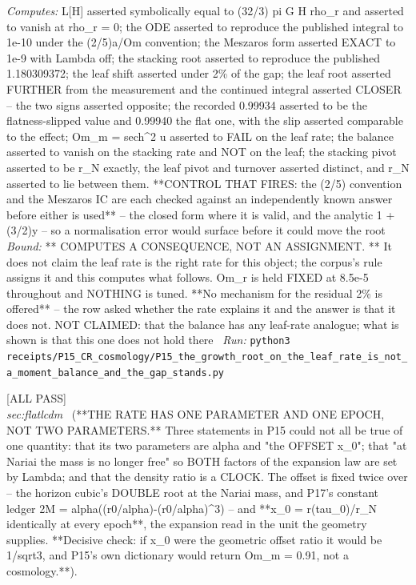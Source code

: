 \begin{description}
\emph{Computes:} L[H] asserted symbolically equal to (32/3) pi G H rho\_r and asserted to vanish at rho\_r = 0; the ODE asserted to reproduce the published integral to 1e-10 under the (2/5)a/Om convention; the Meszaros form asserted EXACT to 1e-9 with Lambda off; the stacking root asserted to reproduce the published 1.180309372; the leaf shift asserted under 2\% of the gap; the leaf root asserted FURTHER from the measurement and the continued integral asserted CLOSER -- the two signs asserted opposite; the recorded 0.99934 asserted to be the flatness-slipped value and 0.99940 the flat one, with the slip asserted comparable to the effect; Om\_m = sech\textasciicircum{}2 u asserted to FAIL on the leaf rate; the balance asserted to vanish on the stacking rate and NOT on the leaf; the stacking pivot asserted to be r\_N exactly, the leaf pivot and turnover asserted distinct, and r\_N asserted to lie between them. **CONTROL THAT FIRES: the (2/5) convention and the Meszaros IC are each checked against an independently known answer before either is used** -- the closed form where it is valid, and the analytic 1 + (3/2)y -- so a normalisation error would surface before it could move the root
 \emph{Bound:} ** COMPUTES A CONSEQUENCE, NOT AN ASSIGNMENT. ** It does not claim the leaf rate is the right rate for this object; the corpus's rule assigns it and this computes what follows. Om\_r is held FIXED at 8.5e-5 throughout and NOTHING is tuned. **No mechanism for the residual 2\% is offered** -- the row asked whether the rate explains it and the answer is that it does not. NOT CLAIMED: that the balance has any leaf-rate analogue; what is shown is that this one does not hold there
\ \emph{Run:} \texttt{python3 receipts/P15\_CR\_cosmology/P15\_the\_growth\_root\_on\_the\_leaf\_rate\_is\_not\_a\_moment\_balance\_and\_the\_gap\_stands.py}
\item[\label{rcpt:P15_the_rate_has_one_parameter_and_one_epoch}\texttt{P15\_the\_rate\_has\_one\_parameter\_and\_one\_epoch}]\hfill\textsf{[ALL PASS]}\\
\textit{sec:flatlcdm} \ (**THE RATE HAS ONE PARAMETER AND ONE EPOCH, NOT TWO PARAMETERS.** Three statements in P15 could not all be true of one quantity: that its two parameters are alpha and "the OFFSET x\_0"; that "at Nariai the mass is no longer free" so BOTH factors of the expansion law are set by Lambda; and that the density ratio is a CLOCK. The offset is fixed twice over -- the horizon cubic's DOUBLE root at the Nariai mass, and P17's constant ledger 2M = alpha((r0/alpha)-(r0/alpha)\textasciicircum{}3) -- and **x\_0 = r(tau\_0)/r\_N identically at every epoch**, the expansion read in the unit the geometry supplies. **Decisive check: if x\_0 were the geometric offset ratio it would be 1/sqrt3, and P15's own dictionary would return Om\_m = 0.91, not a cosmology.**). 

\end{description}
